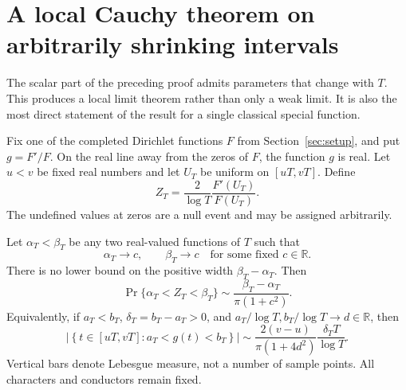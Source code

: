 \section{A local Cauchy theorem on arbitrarily shrinking intervals}
\label{sec:local-cauchy}

The scalar part of the preceding proof admits parameters that change with
$T$.  This produces a local limit theorem rather than only a weak limit.
It is also the most direct statement of the result for a single classical
special function.

Fix one of the completed Dirichlet functions $F$ from
Section~\ref{sec:setup}, and put $g=F'/F$.  On the real line away from
the zeros of $F$, the function $g$ is real.  Let $u<v$ be fixed real
numbers and let $U_T$ be uniform on $[uT,vT]$.  Define
\begin{equation}\label{eq:normalized-random-variable}
 Z_T=\frac{2}{\log T}\frac{F'(U_T)}{F(U_T)}.
\end{equation}
The undefined values at zeros are a null event and may be assigned
arbitrarily.

\begin{theorem}\label{thm:local-cauchy}
Let $\alpha_T<\beta_T$ be any two real-valued functions of $T$ such that
\[
 \alpha_T\longrightarrow c,\qquad\beta_T\longrightarrow c
       \quad\text{for some fixed }c\in\mathbb R.
\]
There is no lower bound on the positive width $\beta_T-\alpha_T$.
Then
\begin{equation}\label{eq:local-cauchy-law}
 \boxed{\displaystyle
  \Pr\{\alpha_T<Z_T<\beta_T\}
      \sim\frac{\beta_T-\alpha_T}{\pi(1+c^2)}.}
\end{equation}
Equivalently, if $a_T<b_T$, $\delta_T=b_T-a_T>0$, and
$a_T/\log T,b_T/\log T\to d\in\mathbb R$, then
\begin{equation}\label{eq:raw-local-law}
 \boxed{\displaystyle
 \left|\left\{t\in[uT,vT]:a_T<g(t)<b_T\right\}\right|
 \sim\frac{2(v-u)}{\pi(1+4d^2)}
                    \frac{\delta_T T}{\log T}.}
\end{equation}
Vertical bars denote Lebesgue measure, not a number of sample points.
All characters and conductors remain fixed.
\end{theorem}

